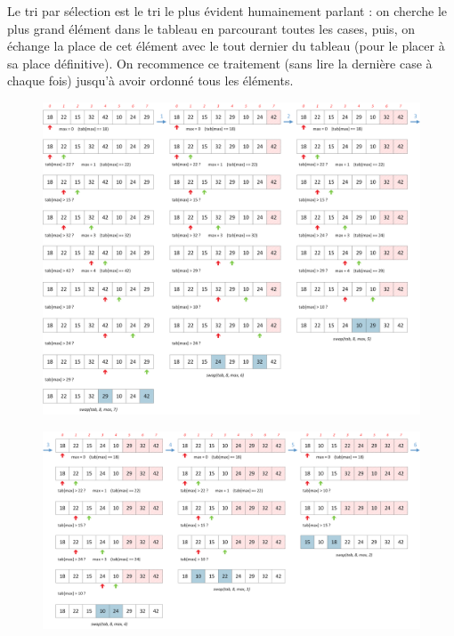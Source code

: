 \documentclass[11pt,a4paper]{article}
\begin{document}
\bigskip

Le tri par sélection est le tri le plus évident humainement parlant : on cherche le plus grand élément dans le tableau en parcourant toutes les cases, puis, on échange la place de cet élément avec le tout dernier du tableau (pour le placer à sa place définitive).
On recommence ce traitement (sans lire la dernière case à chaque fois) jusqu'à avoir ordonné tous les éléments.

\vfillFirst

\begin{figure}[ht!]
\centering
\centerline{
\includegraphics[width=1.2\textwidth]{img/SelectionSort_part1.png}
}
\end{figure}

\vfillLast

\clearpage

\vfillFirst

\begin{figure}[ht!]
\centering
\centerline{
\includegraphics[width=1.2\textwidth]{img/SelectionSort_part2_1.png}
}
\end{figure}
\end{document}
